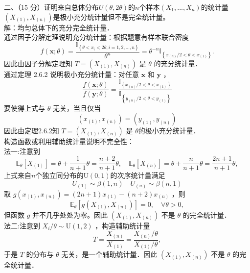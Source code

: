 \documentclass[UTF8]{ctexart}
\begin{document}
\noindent 二、（15 分）证明来自总体分布$U(\theta, 2\theta)$的$n$个样本$(X_1,...,X_n)$的统计量$(X_{(1)}, X_{(n)})$是极小充分统计量但不是完全统计量。\\
解：均匀总体下的充分完全统计量．\\
通过因子分解定理说明充分统计量：根据题意有样本联合密度
$$
f(\boldsymbol{x} ; \theta)=\frac{\mathbb{I}_{\left\{\theta<x_i<2 \theta, i=1,2, \ldots, n\right\}}}{\theta^n}=\theta^{-n} \mathbb{I}_{\left\{x_{(n)} / 2<\theta<x_{(1)}\right\}} .
$$
因此由因子分解定理知 $T=\left( X_{(1)}, X_{(n)}\right) $ 是 $\theta$ 的充分统计量．\\
通过定理 2.6.2 说明极小充分统计量：对任意 $\boldsymbol{x}$ 和 $\boldsymbol{y}$ ，
$$
\frac{f(\boldsymbol{x} ; \theta)}{f(\boldsymbol{y} ; \theta)}=\frac{\mathbb{I}_{\left\{x_{(n)} / 2<\theta<x_{(1)}\right\}}}{\mathbb{I}_{\left\{y_{(n)} / 2<\theta<y_{(1)}\right\}}}
$$
要使得上式与 $\theta$ 无关，当且仅当 $$\left(x_{(1)}, x_{(n)}\right)=\left(y_{(1)}, y_{(n)}\right)$$
因此由定理2.6.2知 $T=\left(X_{(1)}, X_{(n)}\right)$ 是 $\theta$的极小充分统计量．\\
构造函数或利用辅助统计量说明不完全性：\\
法一:注意到
$$
\mathbb{E}_\theta\left[X_{(1)}\right]=\theta+\frac{1}{n+1} \theta=\frac{n+2}{n+1} \theta, \quad \mathbb{E}_\theta\left[X_{(n)}\right]=\theta+\frac{n}{n+1} \theta=\frac{2 n+1}{n+1} \theta,
$$
上式来自$n$个独立同分布的$\mathrm{U}(0,1)$的次序统计量满足
\[
U_{(1)}\sim \beta(1,n) \quad U_{(n)}\sim \beta(n,1)
\]
取 $g\left(x_{(1)}, x_{(n)}\right)=(2 n+1) x_{(1)}-(n+2) x_{(n)}$ ，则
$$
\mathbb{E}_\theta\left[g\left(X_{(1)}, X_{(n)}\right)\right]=0, \quad \forall \theta>0,
$$
但函数 $g$ 并不几乎处处为零。因此 $\left(X_{(1)}, X_{(n)}\right)$ 不是 $\theta$ 的完全统计量．\\
法二:注意到 $X_i / \theta \sim \mathrm{U}(1,2)$ ，构造辅助统计量
$$
T=\frac{X_{(n)}}{X_{(1)}}=\frac{X_{(n)} / \theta}{X_{(1)} / \theta},
$$
于是 $T$ 的分布与 $\theta$ 无关，是一个辅助统计量．因此 $\left(X_{(1)}, X_{(n)}\right)$ 不是 $\theta$ 的完全统计量．\\
\end{document}
